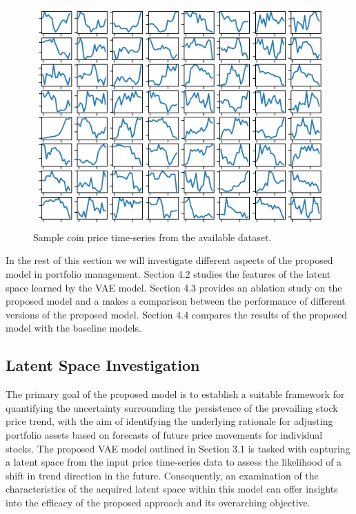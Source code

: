 \begin{figure}[h]
	\centering
	\includegraphics[scale=0.8]{./dataset.png}
	\caption{Sample coin price time-series from the available dataset.}
	\label{fig:dataset}
\end{figure}

In the rest of this section we will investigate different aspects of the proposed model in portfolio management. Section 4.2 studies the features of the latent space learned by the VAE model. Section 4.3 provides an ablation study on the proposed model and a makes a comparison between the performance of different versions of the proposed model. Section 4.4 compares the results of the proposed model with the baseline models.

\subsection{Latent Space Investigation}

The primary goal of the proposed model is to establish a suitable framework for quantifying the uncertainty surrounding the persistence of the prevailing stock price trend, with the aim of identifying the underlying rationale for adjusting portfolio assets based on forecasts of future price movements for individual stocks. The proposed VAE model outlined in Section 3.1 is tasked with capturing a latent space from the input price time-series data to assess the likelihood of a shift in trend direction in the future. Consequently, an examination of the characteristics of the acquired latent space within this model can offer insights into the efficacy of the proposed approach and its overarching objective.

